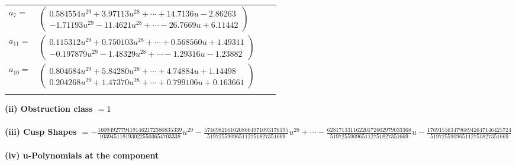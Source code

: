 \documentclass[1p]{elsarticle_modified}
\theoremstyle{definition}
\begin{document}
\begin{tabular}{m{7pt} m{180pt} m{7pt} m{180pt} }
\flushright $a_{7}=$&$\begin{pmatrix}0.584554 u^{29}+3.97113 u^{28}+\cdots+14.7136 u-2.86263\\-1.71193 u^{29}-11.4621 u^{28}+\cdots-26.7669 u+6.11442\end{pmatrix}$ \\
\flushright $a_{11}=$&$\begin{pmatrix}0.115312 u^{29}+0.750103 u^{28}+\cdots+0.568560 u+1.49311\\-0.197879 u^{29}-1.48329 u^{28}+\cdots-1.29316 u-1.23882\end{pmatrix}$ \\
\flushright $a_{10}=$&$\begin{pmatrix}0.804684 u^{29}+5.84280 u^{28}+\cdots+4.74884 u+1.14498\\0.204268 u^{29}+1.47370 u^{28}+\cdots+0.799106 u+0.163661\end{pmatrix}$\\&\end{tabular}
\flushleft \textbf{(ii) Obstruction class $= 1$}\\~\\
\flushleft \textbf{(iii) Cusp Shapes $= -\frac{16094927794191462172380835339}{1039451181930225503654703338} u^{29}-\frac{57469821610208664971093176195}{519725590965112751827351669} u^{28}+\cdots-\frac{62817133116220172602979033368}{519725590965112751827351669} u-\frac{17691556347968942647146425724}{519725590965112751827351669}$}\\~\\
\newpage\renewcommand{\arraystretch}{1}
\flushleft \textbf{(iv) u-Polynomials at the component}\newline \\
\end{document}
